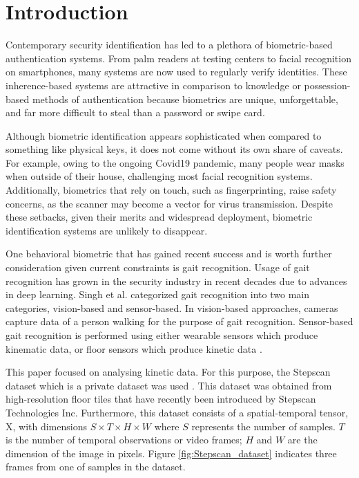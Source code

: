 \section{Introduction}

Contemporary security identification has led to a plethora of biometric-based authentication systems. From palm readers at testing centers to facial recognition on smartphones, many systems are now used to regularly verify identities. These inherence-based systems are attractive in comparison to knowledge or possession-based methods of authentication because biometrics are unique, unforgettable, and far more difficult to steal than a password or swipe card.

Although biometric identification appears sophisticated when compared to something like physical keys, it does not come without its own share of caveats. For example, owing to the ongoing Covid19 pandemic, many people wear masks when outside of their house, challenging most facial recognition systems. Additionally, biometrics that rely on touch, such as fingerprinting, raise safety concerns, as the scanner may become a vector for virus transmission. Despite these setbacks, given their merits and widespread deployment, biometric identification systems are unlikely to disappear.

One behavioral biometric that has gained recent success and is worth further consideration given current constraints is gait recognition. Usage of gait recognition has grown in the security industry in recent decades due to advances in deep learning. Singh et al. \cite{Singh2019APerspectives} categorized gait recognition into two main categories, vision-based and sensor-based. In vision-based approaches, cameras capture data of a person walking for the purpose of gait recognition. Sensor-based gait recognition is performed using either wearable sensors which produce kinematic data, or floor sensors which produce kinetic data \cite{Connor2018BiometricFeatures}.

This paper focused on analysing kinetic data. For this purpose, the Stepscan dataset which is a private dataset was used \cite{Connor2015ComparingBiometrics}. This dataset was obtained from high-resolution floor tiles that have recently been introduced by Stepscan Technologies Inc. Furthermore, this dataset consists of a spatial-temporal tensor, X, with dimensions $S \times T \times H \times W$ where $S$ represents the number of samples. $T$ is the number of temporal observations or video frames; $H$ and $W$ are the dimension of the image in pixels. Figure \ref{fig:Stepscan_dataset} indicates three frames from one of samples in the dataset.  

